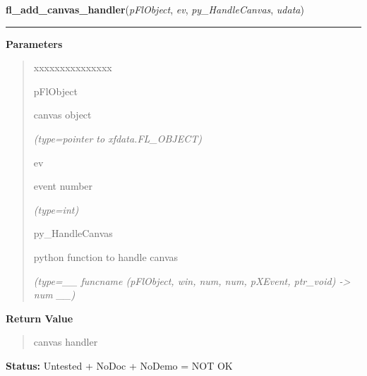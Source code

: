 \hspace{.8\funcindent}\begin{boxedminipage}{\funcwidth}

    \raggedright \textbf{fl\_add\_canvas\_handler}(\textit{pFlObject}, \textit{ev}, \textit{py\_HandleCanvas}, \textit{udata})

    \vspace{-1.5ex}

    \rule{\textwidth}{0.5\fboxrule}
\setlength{\parskip}{2ex}
\setlength{\parskip}{1ex}
      \textbf{Parameters}
      \vspace{-1ex}

      \begin{quote}
        \begin{Ventry}{xxxxxxxxxxxxxxx}

          \item[pFlObject]

          canvas object

            {\it (type=pointer to xfdata.FL\_OBJECT)}

          \item[ev]

          event number

            {\it (type=int)}

          \item[py\_HandleCanvas]

          python function to handle canvas

            {\it (type=\_\_ funcname (pFlObject, win, num, num, pXEvent, ptr\_void) 
-{\textgreater} num \_\_)}

        \end{Ventry}

      \end{quote}

      \textbf{Return Value}
    \vspace{-1ex}

      \begin{quote}
      canvas handler

      \end{quote}

\textbf{Status:} Untested + NoDoc + NoDemo = NOT OK



    \end{boxedminipage}

    \label{xformslib:flcanvas:fl_get_canvas_id}

